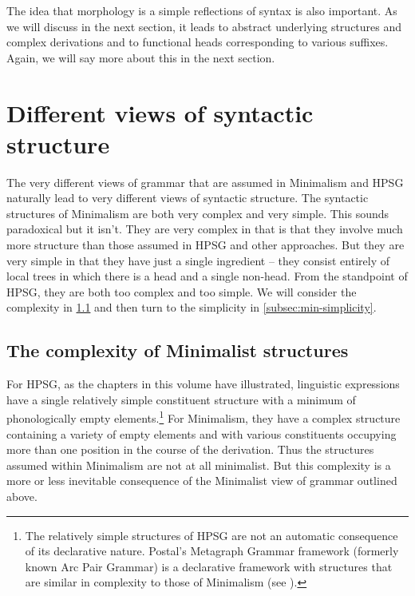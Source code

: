 \documentclass[output=paper]{langsci/langscibook}
\begin{document}
The idea that morphology is a simple reflections of syntax is also important. As we will discuss in the next section, it leads to abstract underlying structures and complex derivations and to functional heads corresponding to various suffixes. Again, we will say more about this in the next section. 
	
\section{Different views of syntactic structure}
\label{sec:min-views-structure}
The very different views of grammar that are assumed in Minimalism and HPSG naturally lead to very different views of syntactic structure. The syntactic structures of Minimalism are both very complex and very simple. This sounds paradoxical but it isn't. They are very complex in that is that they involve much more structure than those assumed in HPSG and other approaches. But they are very simple in that they have just a single ingredient -- they consist entirely of local trees in which there is a head and a single non-head. From the standpoint of HPSG, they are both too complex and too simple. We will consider the complexity in \ref{subsec:min-complexity} and then turn to the simplicity in \ref{subsec:min-simplicity}.

\subsection{The complexity of Minimalist structures}
\label{subsec:min-complexity}
For HPSG, as the chapters in this volume have illustrated, linguistic expressions have a single relatively simple constituent structure with a minimum of phonologically empty elements.\footnote{%
	The relatively simple structures of HPSG are not an automatic consequence of its declarative nature. Postal's Metagraph Grammar framework (formerly known Arc Pair Grammar) is a declarative framework with structures that are similar in complexity to those of Minimalism (see \citealt{Postal.2010}).%
}
For Minimalism, they have a complex structure containing a variety of empty elements and with various constituents occupying more than one position in the course of the derivation. Thus the structures assumed within Minimalism are not at all minimalist. But this complexity is a more or less inevitable consequence of the Minimalist view of grammar outlined above.
\end{document}
